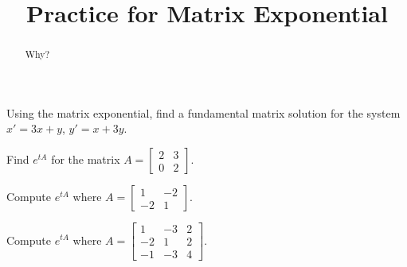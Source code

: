 \documentclass{ximera}
\title{Practice for Matrix Exponential}
\begin{document}
\begin{abstract}
Why?
\end{abstract}
\maketitle

\begin{exercise}
Using the matrix exponential, find a fundamental matrix solution for the system $x' = 3x+y$, $y' = x+3y$.
\end{exercise}

\begin{exercise}
    Find $e^{tA}$ for the matrix $A =
    \left[ \begin{smallmatrix}
        2 & 3 \\
        0 & 2
    \end{smallmatrix} \right]$.
\end{exercise}

\begin{exercise}%
    Compute $e^{tA}$ where
    $A=\left[ \begin{smallmatrix}
        1 & -2 \\
        -2 & 1 
    \end{smallmatrix}\right]$.
\end{exercise}

\begin{exercise}%
    Compute
    $e^{tA}$ where
    $A=\left[ \begin{smallmatrix}
        1 & -3 & 2 \\
        -2 & 1 & 2 \\
        -1 & -3 & 4
    \end{smallmatrix}\right]$.
\end{exercise}
\end{document}
